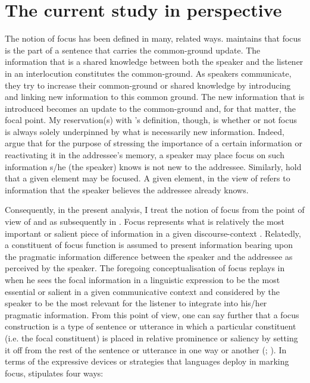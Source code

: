 \documentclass[output=paper,colorlinks,citecolor=brown]{langscibook}
\begin{document}
\section{The current study in perspective}\label{sec:bisilki:3}

The notion of focus has been defined in many, related ways. \citet[92]{VanPutten2016} maintains that focus is the part of a sentence that carries the common-ground update. The information that is a shared knowledge between both the speaker and the listener in an interlocution constitutes the common-ground. As speakers communicate, they try to increase their common-ground or shared knowledge by introducing and linking new information to this common ground. The new information that is introduced becomes an update to the common-ground and, for that matter, the focal point. My reservation(s) with \citeauthor{VanPutten2016}’s definition, though, is whether or not focus is always solely underpinned by what is necessarily new information. Indeed, \citet[59]{Dik1981} argue that for the purpose of stressing the importance of a certain information or reactivating it in the addressee’s memory, a speaker may place focus on such information s/he (the speaker) knows is not new to the addressee. Similarly, \citet[3]{SkopeteasEtAl2006} hold that a given element may be focused. A given element, in the view of \citet[2]{SkopeteasEtAl2006} refers to information that the speaker believes the addressee already knows.

Consequently, in the present analysis, I treat the notion of focus from the point of view of \citet{Dik1981} and as subsequently in \citet{Dik1997}. Focus represents what is relatively the most important or salient piece of information in a given discourse-context \citep[42]{Dik1981}. Relatedly, a constituent of focus function is assumed to present information bearing upon the pragmatic information difference between the speaker and the addressee as perceived by the speaker. The foregoing conceptualisation of focus replays in \citet[326]{Dik1997} when he sees the focal information in a linguistic expression to be the most essential or salient in a given communicative context and considered by the speaker to be the most relevant for the listener to integrate into his/her pragmatic information. From this point of view, one can say further that a focus construction is a type of sentence or utterance in which a particular constituent (i.e. the focal constituent) is placed in relative prominence or saliency by setting it off from the rest of the sentence or utterance in one way or another (\citealt{Boadi1974, DrubigSchaffer2001}; \citealt[185]{MarfoBodomo2005}). In terms of the expressive devices or strategies that languages deploy in marking focus, \citet[43]{Dik1981} stipulates four ways:
\end{document}
